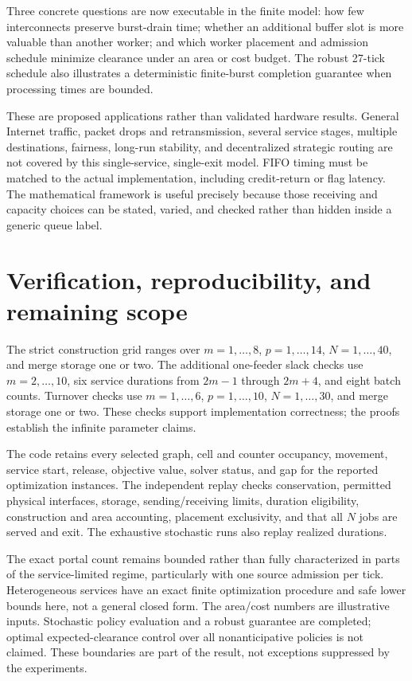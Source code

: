 \documentclass[11pt]{article}
\begin{document}
Three concrete questions are now executable in the finite model: how few interconnects preserve burst-drain time; whether an additional buffer slot is more valuable than another worker; and which worker placement and admission schedule minimize clearance under an area or cost budget. The robust 27-tick schedule also illustrates a deterministic finite-burst completion guarantee when processing times are bounded.

These are proposed applications rather than validated hardware results. General Internet traffic, packet drops and retransmission, several service stages, multiple destinations, fairness, long-run stability, and decentralized strategic routing are not covered by this single-service, single-exit model. FIFO timing must be matched to the actual implementation, including credit-return or flag latency. The mathematical framework is useful precisely because those receiving and capacity choices can be stated, varied, and checked rather than hidden inside a generic queue label.

\section{Verification, reproducibility, and remaining scope}

The strict construction grid ranges over $m=1,\ldots,8$, $p=1,\ldots,14$, $N=1,\ldots,40$, and merge storage one or two. The additional one-feeder slack checks use $m=2,\ldots,10$, six service durations from $2m-1$ through $2m+4$, and eight batch counts. Turnover checks use $m=1,\ldots,6$, $p=1,\ldots,10$, $N=1,\ldots,30$, and merge storage one or two. These checks support implementation correctness; the proofs establish the infinite parameter claims.

The code retains every selected graph, cell and counter occupancy, movement, service start, release, objective value, solver status, and gap for the reported optimization instances. The independent replay checks conservation, permitted physical interfaces, storage, sending/receiving limits, duration eligibility, construction and area accounting, placement exclusivity, and that all $N$ jobs are served and exit. The exhaustive stochastic runs also replay realized durations.

The exact portal count remains bounded rather than fully characterized in parts of the service-limited regime, particularly with one source admission per tick. Heterogeneous services have an exact finite optimization procedure and safe lower bounds here, not a general closed form. The area/cost numbers are illustrative inputs. Stochastic policy evaluation and a robust guarantee are completed; optimal expected-clearance control over all nonanticipative policies is not claimed. These boundaries are part of the result, not exceptions suppressed by the experiments.
\end{document}
